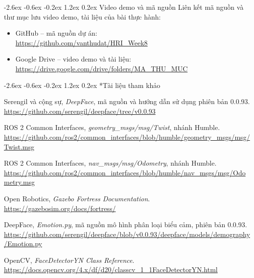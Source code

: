 \documentclass[13pt,a4paper]{extarticle}
\makeatletter
\renewcommand\section{\@startsection{section}{1}{\z@}%
  {-2.6ex \@plus -0.6ex \@minus -0.2ex}%
  {1.2ex \@plus 0.2ex}%
  {\normalfont\fontsize{14}{17}\selectfont\bfseries}}
\makeatother
\begin{document}
\section{Video demo và mã nguồn}
Liên kết mã nguồn và thư mục lưu video demo, tài liệu của bài thực hành:
\begin{itemize}
\item GitHub -- mã nguồn dự án:\\
\url{https://github.com/vanthudat/HRI_Week8}
\item Google Drive -- video demo và tài liệu:\\
\url{https://drive.google.com/drive/folders/MA_THU_MUC}
\end{itemize}

\section*{Tài liệu tham khảo}
\begin{enumerate}[label={[\arabic*]},leftmargin=2em]
\item \label{ref:deepface} Serengil và cộng sự, \textit{DeepFace}, mã nguồn và hướng dẫn sử dụng phiên bản 0.0.93.\\
\url{https://github.com/serengil/deepface/tree/v0.0.93}
\item \label{ref:twist} ROS 2 Common Interfaces, \textit{geometry\_msgs/msg/Twist}, nhánh Humble.\\
\url{https://github.com/ros2/common_interfaces/blob/humble/geometry_msgs/msg/Twist.msg}
\item \label{ref:odom} ROS 2 Common Interfaces, \textit{nav\_msgs/msg/Odometry}, nhánh Humble.\\
\url{https://github.com/ros2/common_interfaces/blob/humble/nav_msgs/msg/Odometry.msg}
\item \label{ref:gazebo} Open Robotics, \textit{Gazebo Fortress Documentation}.\\
\url{https://gazebosim.org/docs/fortress/}
\item \label{ref:emotionmodel} DeepFace, \textit{Emotion.py}, mã nguồn mô hình phân loại biểu cảm, phiên bản 0.0.93.\\
\url{https://github.com/serengil/deepface/blob/v0.0.93/deepface/models/demography/Emotion.py}
\item \label{ref:yunet} OpenCV, \textit{FaceDetectorYN Class Reference}.\\
\url{https://docs.opencv.org/4.x/df/d20/classcv_1_1FaceDetectorYN.html}
\end{enumerate}
\end{document}
